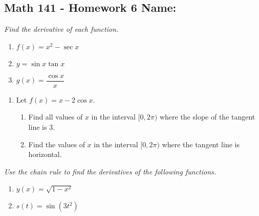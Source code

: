 \documentclass[11pt]{article}
\newcommand{\ds}{\displaystyle}
\begin{document}
\pagestyle{empty}
\subsection*{Math 141 - Homework 6 \hfill Name: \underline{\hspace*{2in}}}

\textit{Find the derivative of each function.}
\begin{multicols}{3}
\begin{enumerate}
\item $f(x) = x^2 - \sec x$
\item $y = \sin x \tan x$
\item $\ds g(x) = \dfrac{\cos x}{x}$
\setcounter{enumCount}{\theenumi}
\end{enumerate}
\end{multicols}
\vfill



\begin{enumerate}
\setcounter{enumi}{\theenumCount}
\item Let $f(x) = x - 2 \cos x$. 
\begin{enumerate}
\item Find all values of $x$ in the interval $[0,2\pi)$ where the slope of the tangent line is $3$. 
\vfill
\item Find the values of $x$ in the interval $[0,2\pi)$ where the tangent line is horizontal. 
\vfill
\end{enumerate}

\setcounter{enumCount}{\theenumi}
\end{enumerate}

\noindent
\textit{Use the chain rule to find the derivatives of the following functions.}
\noindent
\begin{multicols}{2}
\begin{enumerate}
\setcounter{enumi}{\theenumCount}
\item $y(x) = \sqrt{1-x^2}$
\item $s(t) = \sin (3t^2)$
\setcounter{enumCount}{\theenumi}
\end{enumerate}
\end{multicols}
\vfill
\end{document}

